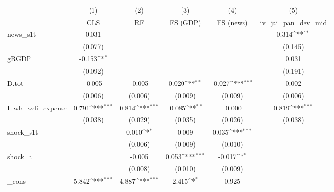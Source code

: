 {
\def\sym#1{\ifmmode^{#1}\else\(^{#1}\)\fi}
\begin{tabular}{l*{5}{c}}
\toprule
            &\multicolumn{1}{c}{(1)}&\multicolumn{1}{c}{(2)}&\multicolumn{1}{c}{(3)}&\multicolumn{1}{c}{(4)}&\multicolumn{1}{c}{(5)}\\
            &\multicolumn{1}{c}{OLS}&\multicolumn{1}{c}{RF}&\multicolumn{1}{c}{FS (GDP)}&\multicolumn{1}{c}{FS (news)}&\multicolumn{1}{c}{iv\_jai\_pan\_dev\_mid}\\
\midrule
news\_s1t    &       0.031         &                     &                     &                     &       0.314\sym{**} \\
            &     (0.077)         &                     &                     &                     &     (0.145)         \\
\addlinespace
gRGDP       &      -0.153\sym{*}  &                     &                     &                     &       0.031         \\
            &     (0.092)         &                     &                     &                     &     (0.191)         \\
\addlinespace
D.tot       &      -0.005         &      -0.005         &       0.020\sym{**} &      -0.027\sym{***}&       0.002         \\
            &     (0.006)         &     (0.006)         &     (0.009)         &     (0.009)         &     (0.006)         \\
\addlinespace
L.wb\_wdi\_expense&       0.791\sym{***}&       0.814\sym{***}&      -0.085\sym{**} &      -0.000         &       0.819\sym{***}\\
            &     (0.038)         &     (0.029)         &     (0.035)         &     (0.026)         &     (0.038)         \\
\addlinespace
shock\_s1t   &                     &       0.010\sym{*}  &       0.009         &       0.035\sym{***}&                     \\
            &                     &     (0.006)         &     (0.009)         &     (0.010)         &                     \\
\addlinespace
shock\_t     &                     &      -0.005         &       0.053\sym{***}&      -0.017\sym{*}  &                     \\
            &                     &     (0.008)         &     (0.010)         &     (0.009)         &                     \\
\addlinespace
\_cons      &       5.842\sym{***}&       4.887\sym{***}&       2.415\sym{*}  &       0.925         &                     \\

\end{tabular}}
